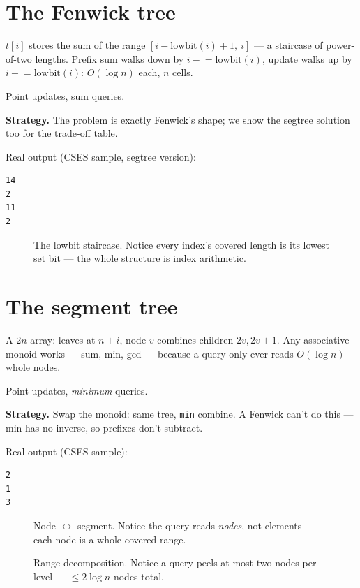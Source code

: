 \section{The Fenwick tree}\label{sec:fenwick}
$t[i]$ stores the sum of the range $[i-\mathrm{lowbit}(i)+1,\ i]$ ---
a staircase of power-of-two lengths. Prefix sum walks down by
$i \mathrel{-}= \mathrm{lowbit}(i)$, update walks up by
$i \mathrel{+}= \mathrm{lowbit}(i)$: $O(\log n)$ each, $n$ cells.
\begin{example}\label{ex:rsq}
Point updates, sum queries.
\par\smallskip
\textbf{Strategy.} The problem is exactly Fenwick's shape; we
show the segtree solution too for the trade-off table.
\par\smallskip
\begin{solution}

Real output (CSES sample, segtree version):
\begin{lstlisting}[numbers=none]
14
2
11
2
\end{lstlisting}
\end{solution}
\end{example}
\begin{figure}[ht]\centering

\caption{The lowbit staircase. Notice every index's covered length
is its lowest set bit --- the whole structure is index arithmetic.}
\label{fig:fenwick}
\end{figure}

\section{The segment tree}\label{sec:segtree}
A $2n$ array: leaves at $n{+}i$, node $v$ combines children
$2v,2v{+}1$. Any associative monoid works --- sum, min, gcd ---
because a query only ever reads $O(\log n)$ whole nodes.
\begin{example}\label{ex:rmq}
Point updates, \emph{minimum} queries.
\par\smallskip
\textbf{Strategy.} Swap the monoid: same tree, \texttt{min} combine.
A Fenwick can't do this --- min has no inverse, so prefixes don't
subtract.
\par\smallskip
\begin{solution}

Real output (CSES sample):
\begin{lstlisting}[numbers=none]
2
1
3
\end{lstlisting}
\end{solution}
\end{example}
\begin{figure}[ht]\centering

\caption{Node $\leftrightarrow$ segment. Notice the query reads
\emph{nodes}, not elements --- each node is a whole covered range.}
\label{fig:segtree}
\end{figure}
\begin{figure}[ht]\centering

\caption{Range decomposition. Notice a query peels at most two
nodes per level --- $\le 2\log n$ nodes total.}
\label{fig:decomp}
\end{figure}

